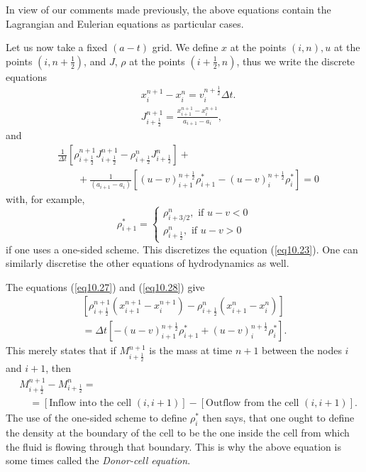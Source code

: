 \begin{remark}\label{chap10:rem10.1}
In view of our comments made previously, the above equations contain the Lagrangian and Eulerian equations as particular cases.
\end{remark}

Let us now take a fixed $(a-t)$ grid. We define $x$ at the points $(i,n), u$ at the points $(i, n + \frac{1}{2})$, and $J$, $\rho$ at the points $(i+\frac{1}{2},n)$, thus we write the discrete equations
\begin{align*}
& x^{n+1}_i  - x^n_i = v^{n+\frac{1}{2}}_i \Delta t. 
\tag{10.26}\label{eq10.26}\\
& J^{n+1}_{i+\frac{1}{2}}  = \frac{x^{n+1}_{i+1} - x^{n+1}_i}{a_{i+1} - a_i}, 
\tag{10.27}\label{eq10.27}
\end{align*}
and 
\begin{align*}
&  \frac{1}{\Delta t} \left[\rho^{n+1}_{i+\frac{1}{2}} J^{n+1}_{i+\frac{1}{2}} - \rho^n_{i+ \frac{1}{2}} J^n_{i+\frac{1}{2}}  \right] +\\
&  \qquad + \frac{1}{(a_{i+1} - a_i)} \left[(u-v)^{n+\frac{1}{2}}_{i+1} \rho^*_{i+1} - (u-v)^{n+\frac{1}{2}}_i \rho^*_{i} \right] = 0 \tag{10.28}\label{eq10.28}
\end{align*}\pageoriginale
with, for example,
\begin{equation*}
\rho^*_{i+1} = 
\begin{cases}
\rho^n_{i+3/2}, \text{ if } u - v < 0\\
\rho^n_{i+\frac{1}{2}}, \text{ if } u - v > 0
\end{cases}\tag{10.29}\label{eq10.29}
\end{equation*}
if one uses a one-sided scheme. This discretizes the equation (\ref{eq10.23}). One can similarly discretise the other equations of hydrodynamics as well.

\begin{remark}\label{chap10:rem10.2}
The equations (\ref{eq10.27}) and (\ref{eq10.28}) give 
\begin{multline*}
\left[\rho^{n+1}_{i+\frac{1}{2}} (x^{n+1}_{i+1} - x^{n+1}_i) -
  \rho^n_{i+\frac{1}{2}} (x^n_{i+1} - x^n_i) \right]\\ 
= \Delta t \left[
  -(u-v)^{n+\frac{1}{2}}_{i+1} \rho^*_{i+1} +(u-v)^{n+\frac{1}{2}}_i
  \rho^*_{i}\right].  
\end{multline*}
This merely states that if $M^{n+1}_{i+\frac{1}{2}}$ is the mass at time $n+1$ between the nodes $i$ and $i+1$, then 
\begin{align*}
& M^{n+1}_{i+\frac{1}{2}} - M^n_{i+\frac{1}{2}} = \\
& \quad = [\text{Inflow into the cell $(i, i+1)$}] - [\text{Outflow from the cell $(i,i+1)$}]. 
\end{align*}
The use of the one-sided scheme to define $\rho^*_i$ then says, that one ought to define the density at the boundary of the cell to be the one inside the cell from which the fluid is flowing through that boundary. This is why the above equation is some times called the {\em Donor-cell equation}.
\end{remark}

